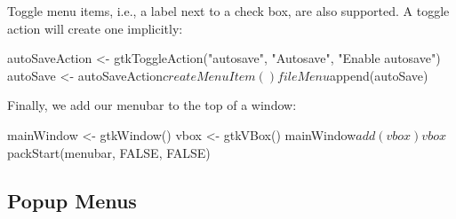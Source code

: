 Toggle menu items, i.e., a label next to a check box, are also
supported. A toggle action will create one implicitly:
\begin{Schunk}
\begin{Sinput}
 autoSaveAction <- gtkToggleAction("autosave", "Autosave", 
                                   "Enable autosave")
 autoSave <- autoSaveAction$createMenuItem()
 fileMenu$append(autoSave)
\end{Sinput}
\end{Schunk}

Finally, we add our menubar to the top of a window:
\begin{Schunk}
\begin{Sinput}
 mainWindow <- gtkWindow()
 vbox <- gtkVBox()
 mainWindow$add(vbox)
 vbox$packStart(menubar, FALSE, FALSE)
\end{Sinput}
\end{Schunk}

\subsection{Popup Menus}


